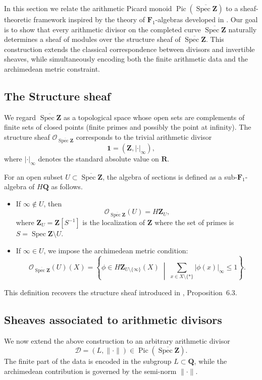 \documentclass[11pt,a4paper]{article}
\newcommand{\Q}{\mathbf{Q}}
\newcommand{\Z}{\mathbf{Z}}
\newcommand{\R}{\mathbf{R}}
\def\spzb{\overline{\Spec \Z}}
\newcommand{\Spec}{\operatorname{Spec}}
\def\Pic{\operatorname{Pic}}
\theoremstyle{plain}
\theoremstyle{definition} %
\begin{document}
In this section we relate the arithmetic Picard monoid $\Pic(\spzb)$ to a
sheaf-theoretic framework inspired by the theory of $\mathbf F_1$-algebras developed
in \cite{CC2}.
Our goal is to show that every arithmetic divisor on the completed curve
$\spzb$ naturally determines a sheaf of modules over the structure sheaf of $\spzb$.
This construction extends the classical correspondence between divisors and
invertible sheaves, while simultaneously encoding both the finite arithmetic data
and the archimedean metric constraint.



\subsection{The Structure sheaf}

We regard $\spzb$ as a topological space whose open sets are complements of
finite sets of closed points (finite primes and possibly the point at infinity).
The structure sheaf $\mathcal O_{\spzb}$ corresponds to the trivial arithmetic
divisor
\[
\mathbf{1}=(\Z,|\cdot|_\infty),
\]
where $|\cdot|_\infty$ denotes the standard absolute value on $\R$.


For an open subset $U\subset\spzb$, the algebra of sections is defined as a
sub-$\mathbf F_1$-algebra of $H\Q$ as follows.

\begin{itemize}[leftmargin=*, labelindent=0pt]
\item If $\infty\notin U$, then
\[
\mathcal O_{\spzb}(U)=H\Z_U,
\]
where $\Z_U=\Z[S^{-1}]$ is the localization of $\Z$ where the set of primes is
$S=\Spec\Z\setminus U$.

\item If $\infty\in U$, we impose the archimedean metric condition:
\[
\mathcal O_{\spzb}(U)(X)
=
\left\{
\phi\in H\Z_{U\setminus\{\infty\}}(X)
\;\middle|\;
\sum_{x\in X\setminus\{*\}}|\phi(x)|_\infty\le 1
\right\}.
\]
\end{itemize}

This definition recovers the structure sheaf introduced in
\cite{CC2}, Proposition~6.3.



\subsection{Sheaves associated to arithmetic divisors}

We now extend the above construction  to an arbitrary
arithmetic divisor
\[
\mathcal D=(L,\|\cdot\|)\in\Pic(\spzb).
\]
The finite part of the data is encoded in the subgroup $L\subset\Q$, while the
archimedean contribution is governed by the semi-norm $\|\cdot\|$.
\end{document}
